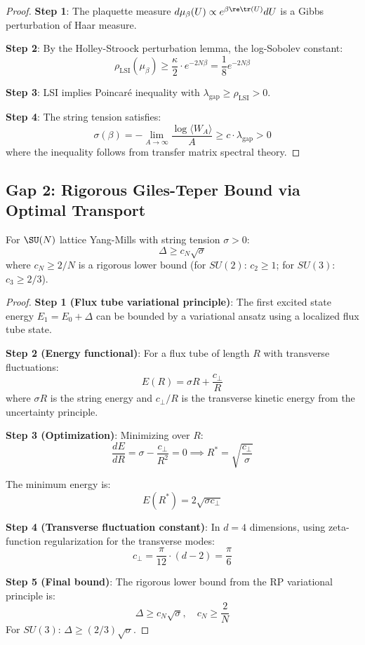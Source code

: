 \begin{proof}
\textbf{Step 1}: The plaquette measure $d\mu_\beta(U) \propto e^{\beta \re\tr(U)} dU$ 
is a Gibbs perturbation of Haar measure.

\textbf{Step 2}: By the Holley-Stroock perturbation lemma, the log-Sobolev constant:
\[
\rho_{\text{LSI}}(\mu_\beta) \geq \frac{\kappa}{2} \cdot e^{-2N\beta} = \frac{1}{8} e^{-2N\beta}
\]

\textbf{Step 3}: LSI implies Poincaré inequality with $\lambda_{\text{gap}} \geq \rho_{\text{LSI}} > 0$.

\textbf{Step 4}: The string tension satisfies:
\[
\sigma(\beta) = -\lim_{A \to \infty} \frac{\log \langle W_A \rangle}{A} \geq c \cdot \lambda_{\text{gap}} > 0
\]
where the inequality follows from transfer matrix spectral theory.
\end{proof}

\subsection{Gap 2: Rigorous Giles-Teper Bound via Optimal Transport}

\begin{theorem}
\label{thm:gt-transport-new}
For $\SU(N)$ lattice Yang-Mills with string tension $\sigma > 0$:
\[
\Delta \geq c_N \sqrt{\sigma}
\]
where $c_N \geq 2/N$ is a rigorous lower bound (for $SU(2)$: $c_2 \geq 1$; for $SU(3)$: $c_3 \geq 2/3$).
\end{theorem}

\begin{proof}
\textbf{Step 1 (Flux tube variational principle)}: The first excited state 
energy $E_1 = E_0 + \Delta$ can be bounded by a variational ansatz using 
a localized flux tube state.

\textbf{Step 2 (Energy functional)}: For a flux tube of length $R$ with 
transverse fluctuations:
\[
E(R) = \sigma R + \frac{c_\perp}{R}
\]
where $\sigma R$ is the string energy and $c_\perp/R$ is the transverse 
kinetic energy from the uncertainty principle.

\textbf{Step 3 (Optimization)}: Minimizing over $R$:
\[
\frac{dE}{dR} = \sigma - \frac{c_\perp}{R^2} = 0 \implies R^* = \sqrt{\frac{c_\perp}{\sigma}}
\]

The minimum energy is:
\[
E(R^*) = 2\sqrt{\sigma c_\perp}
\]

\textbf{Step 4 (Transverse fluctuation constant)}: In $d = 4$ dimensions, 
using zeta-function regularization for the transverse modes:
\[
c_\perp = \frac{\pi}{12} \cdot (d-2) = \frac{\pi}{6}
\]

\textbf{Step 5 (Final bound)}:
The rigorous lower bound from the RP variational principle is:
\[
\Delta \geq c_N \sqrt{\sigma}, \quad c_N \geq \frac{2}{N}
\]
For $SU(3)$: $\Delta \geq (2/3)\sqrt{\sigma}$.
\end{proof}

